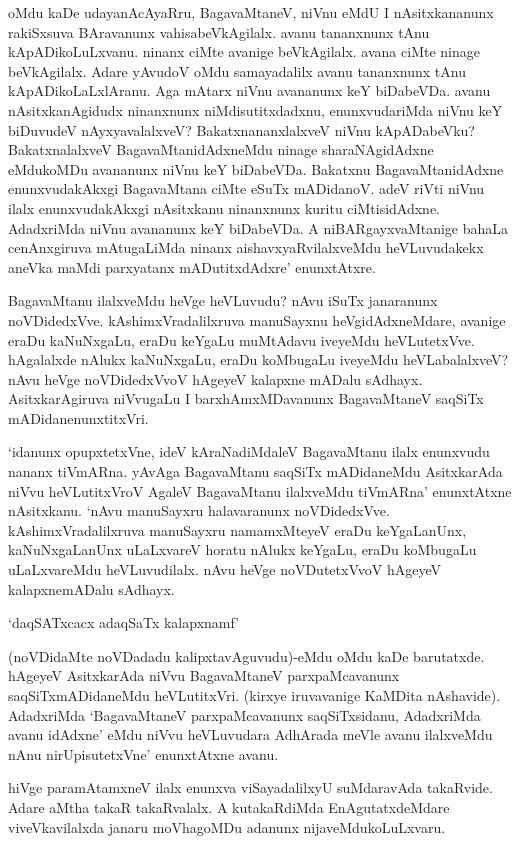oMdu kaDe udayanAcAyaRru, BagavaMtaneV, niVnu eMdU I nAsitxkananunx rakiSxsuva BAravanunx vahisabeVkAgilalx. avanu tananxnunx tAnu kApADikoLuLxvanu. ninanx ciMte avanige beVkAgilalx. avana ciMte ninage beVkAgilalx. Adare yAvudoV oMdu samayadalilx avanu tananxnunx tAnu kApADikoLaLxlAranu. Aga mAtarx niVnu avananunx keY biDabeVDa. avanu nAsitxkanAgidudx ninanxnunx niMdisutitxdadxnu, enunxvudariMda niVnu keY biDuvudeV nAyxyavalalxveV? BakatxnananxlalxveV niVnu kApADabeVku? BakatxnalalxveV BagavaMtanidAdxneMdu ninage sharaNAgidAdxne eMdukoMDu avananunx niVnu keY biDabeVDa. Bakatxnu BagavaMtanidAdxne enunxvudakAkxgi BagavaMtana ciMte eSuTx mADidanoV. adeV riVti niVnu ilalx enunxvudakAkxgi nAsitxkanu ninanxnunx kuritu ciMtisidAdxne. AdadxriMda niVnu avananunx keY biDabeVDa. A niBARgayxvaMtanige bahaLa cenAnxgiruva mAtugaLiMda ninanx aishavxyaRvilalxveMdu heVLuvudakekx aneVka maMdi parxyatanx mADutitxdAdxre' enunxtAtxre.

BagavaMtanu ilalxveMdu heVge heVLuvudu? nAvu iSuTx janaranunx noVDidedxVve. kAshimxVradalilxruva manuSayxnu heVgidAdxneMdare, avanige eraDu kaNuNxgaLu, eraDu keYgaLu muMtAdavu iveyeMdu heVLutetxVve. hAgalalxde nAlukx kaNuNxgaLu, eraDu koMbugaLu iveyeMdu heVLabalalxveV? nAvu heVge noVDidedxVvoV hAgeyeV kalapxne mADalu sAdhayx. AsitxkarAgiruva niVvugaLu I barxhAmxMDavanunx BagavaMtaneV saqSiTx mADidanenunxtitxVri.

`idanunx opupxtetxVne, ideV kAraNadiMdaleV BagavaMtanu ilalx enunxvudu nananx tiVmARna. yAvAga BagavaMtanu saqSiTx mADidaneMdu AsitxkarAda niVvu heVLutitxVroV AgaleV BagavaMtanu ilalxveMdu tiVmARna' enunxtAtxne nAsitxkanu. `nAvu manuSayxru halavaranunx noVDidedxVve. kAshimxVradalilxruva manuSayxru namamxMteyeV eraDu keYgaLanUnx, kaNuNxgaLanUnx uLaLxvareV horatu nAlukx keYgaLu, eraDu koMbugaLu uLaLxvareMdu heVLuvudilalx. nAvu heVge noVDutetxVvoV hAgeyeV kalapxnemADalu sAdhayx.

\begin{shloka}
`daqSATxcacx adaqSaTx kalapxnamf'
\end{shloka}

(noVDidaMte noVDadadu kalipxtavAguvudu)-eMdu oMdu kaDe barutatxde. hAgeyeV AsitxkarAda niVvu BagavaMtaneV parxpaMcavanunx saqSiTxmADidaneMdu heVLutitxVri. (kirxye iruvavanige KaMDita nAshavide). AdadxriMda `BagavaMtaneV parxpaMcavanunx saqSiTxsidanu, AdadxriMda avanu idAdxne' eMdu niVvu heVLuvudara AdhArada meVle avanu ilalxveMdu nAnu nirUpisutetxVne' enunxtAtxne avanu.

hiVge paramAtamxneV ilalx enunxva viSayadalilxyU suMdaravAda takaRvide. Adare aMtha takaR takaRvalalx. A kutakaRdiMda EnAgutatxdeMdare viveVkavilalxda janaru moVhagoMDu adanunx nijaveMdukoLuLxvaru.

